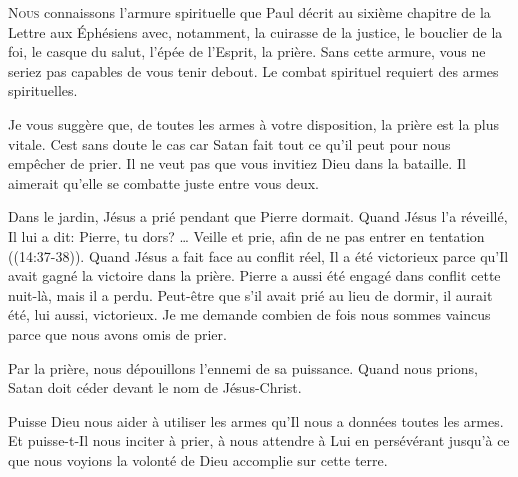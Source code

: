\dvrule







\lettrine{N}{ous} connaissons l'armure spirituelle que Paul décrit
 au sixième chapitre de la Lettre aux Éphésiens avec, notamment,
 la cuirasse de la justice, le bouclier de la foi, le casque du salut,
 l'épée de l'Esprit, la prière. Sans cette armure,
 vous ne seriez pas capables de vous tenir debout.
 Le combat spirituel requiert des armes spirituelles.

Je vous suggère que, de toutes les armes à votre disposition,
 la prière est la plus vitale. Cest sans doute le cas car Satan
 fait tout ce qu'il peut pour nous empêcher de prier.
 Il ne veut pas que vous invitiez Dieu dans la bataille.
 Il aimerait qu'elle se combatte juste entre vous deux.


Dans le jardin, Jésus a prié pendant que Pierre dormait.
 Quand Jésus l'a réveillé, Il lui a dit: 
 \Og Pierre, tu dors? \dots{} Veille et prie, afin de ne pas entrer
 en tentation \Fg{} ((14:37-38)).
 Quand Jésus a fait face au conflit réel, Il a été victorieux
 parce qu'Il avait gagné la victoire dans la prière.
 Pierre a aussi été engagé dans conflit cette nuit-là, mais il a perdu.
 Peut-être que s'il avait prié au lieu de dormir,
 il aurait été, lui aussi, victorieux. Je me demande combien de fois
 nous sommes vaincus parce que nous avons omis de prier.

Par la prière, nous dépouillons l'ennemi de sa puissance.
 Quand nous prions, Satan doit céder devant le nom de Jésus-Christ.

Puisse Dieu nous aider à utiliser les armes qu'Il nous a données
 \ocadr toutes les armes. Et puisse-t-Il nous inciter à prier,
 à nous attendre à Lui en persévérant jusqu'à ce que nous voyions
 la volonté de Dieu accomplie sur cette terre.

